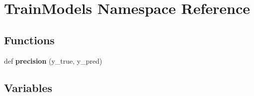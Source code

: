 \hypertarget{namespaceTrainModels}{}\section{Train\+Models Namespace Reference}
\label{namespaceTrainModels}
\subsection*{Functions}
\begin{DoxyCompactItemize}
\item 
\mbox{\label{namespaceTrainModels_a9a9e9888cd4c9e93ad92cca90ddab8ee}} 
def {\bfseries precision} (y\+\_\+true, y\+\_\+pred)
\end{DoxyCompactItemize}
\subsection*{Variables}
